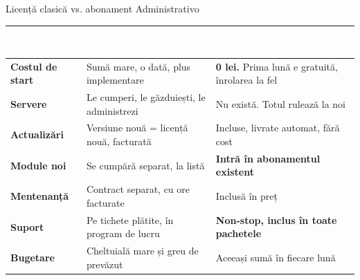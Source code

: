 \documentclass[aspectratio=169,11pt,t,xcolor={table}]{beamer}
\begin{document}
\begin{frame}{Licență clasică vs. abonament Administrativo}
  \vspace{2pt}
  \setlength{\tabcolsep}{5pt}
  \renewcommand{\arraystretch}{1.28}
  {\footnotesize
  \begin{tabular}{@{}>{\raggedright\arraybackslash}p{3.4cm}
                    >{\raggedright\arraybackslash}p{4.95cm}
                    >{\raggedright\arraybackslash}p{5.15cm}@{}}
    \rowcolor{brandNavy}
    \textcolor{white}{\bfseries } &
    \textcolor{white}{\bfseries Licență clasică, cumpărată} &
    \textcolor{white}{\bfseries Abonament Administrativo} \\
    \midrule
    \textbf{Costul de start} & Sumă mare, o dată, plus implementare &
      \textbf{0 lei.} Prima lună e gratuită, înrolarea la fel \\
    \rowcolor{brandMist}
    \textbf{Servere} & Le cumperi, le găzduiești, le administrezi &
      Nu există. Totul rulează la noi \\
    \textbf{Actualizări} & Versiune nouă = licență nouă, facturată &
      Incluse, livrate automat, fără cost \\
    \rowcolor{brandMist}
    \textbf{Module noi} & Se cumpără separat, la listă &
      \textbf{Intră în abonamentul existent} \\
    \textbf{Mentenanță} & Contract separat, cu ore facturate &
      Inclusă în preț \\
    \rowcolor{brandMist}
    \textbf{Suport} & Pe tichete plătite, în program de lucru &
      \textbf{Non-stop, inclus în toate pachetele} \\
    \textbf{Bugetare} & Cheltuială mare și greu de prevăzut &
      Aceeași sumă în fiecare lună \\
    \bottomrule
  \end{tabular}}
\end{frame}
\end{document}
